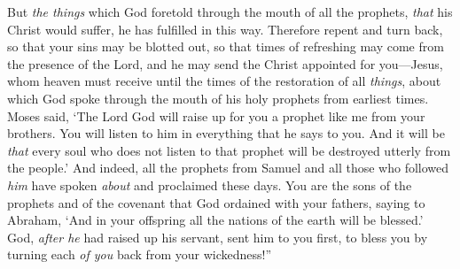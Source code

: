 \begin{biblechapter}
\verse But \textit{the things} which God foretold through the mouth of all the prophets, \textit{that} his Christ would suffer, he has fulfilled in this way.
\verse Therefore repent and turn back, so that your sins may be blotted out,
\verse so that times of refreshing may come from the presence of the Lord, and he may send the Christ appointed for you—Jesus,
\verse whom heaven must receive until the times of the restoration of all \textit{things}, about which God spoke through the mouth of his holy prophets from earliest times.
\verse Moses said, ‘The Lord God will raise up for you a prophet like me from your brothers. You will listen to him in everything that he says to you.
\verse And it will be \textit{that} every soul who does not listen to that prophet will be destroyed utterly from the people.’
\verse And indeed, all the prophets from Samuel and all those who followed \textit{him} have spoken \textit{about} and proclaimed these days.
\verse You are the sons of the prophets and of the covenant that God ordained with your fathers, saying to Abraham, ‘And in your offspring all the nations of the earth will be blessed.’
\verse God, \textit{after he} had raised up his servant, sent him to you first, to bless you by turning each \textit{of you} back from your wickedness!”
\end{biblechapter}

